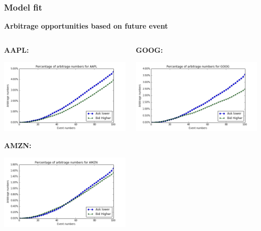 \documentclass[xcolor={x11names,svgnames,dvipsnames}]{beamer}
\begin{document}
\begin{frame}
\frametitle{Model fit}
\textbf{Arbitrage opportunities based on future event}
\begin{columns}		
		\begin{column}{.5\textwidth}
		   \textbf{AAPL:}

						\includegraphics[width=1\textwidth, height=0.4\textheight]{AAPL_arbitrage_event.png}

			 \textbf{AMZN:}

									\includegraphics[width=1\textwidth, height=0.4\textheight]{AMZN_arbitrage_event.png}

		\end{column}
		\begin{column}{.5\textwidth}
			 \textbf{GOOG:}

									\includegraphics[width=1\textwidth, height=0.4\textheight]{GOOG_arbitrage_event.png}


\end{column}
\end{columns}
\end{frame}
\end{document}
